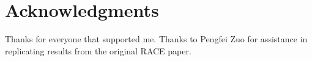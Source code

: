 \documentclass[10pt,twocolumn]{article}
\begin{document}










\section*{Acknowledgments}

Thanks for everyone that supported me. Thanks to Pengfei Zuo
for assistance in replicating results from the original RACE
paper.


\balance
\vspace{-0.3cm}
{\footnotesize 
}
\vspace{-0.5cm}
\end{document}
